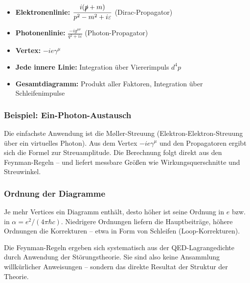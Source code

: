 \vspace{0.5em}
\begin{tcolorbox}[mathebox, title=Feynman-Regeln der QED (vereinfacht)]
	\label{box:Feynman-Regeln der QED}
	\begin{itemize}
		\item \textbf{Elektronenlinie:} $\displaystyle \frac{i(\slashed{p} + m)}{p^2 - m^2 + i\varepsilon}$ (Dirac-Propagator)
		\item \textbf{Photonenlinie:} $\displaystyle \frac{-ig^{\mu\nu}}{q^2 + i\varepsilon}$ (Photon-Propagator)
		\item \textbf{Vertex:} $-ie\gamma^\mu$
		\item \textbf{Jede innere Linie:} Integration über Viererimpuls $d^4p$
		\item \textbf{Gesamtdiagramm:} Produkt aller Faktoren, Integration über Schleifenimpulse
	\end{itemize}
\end{tcolorbox}

\subsubsection*{Beispiel: Ein-Photon-Austausch}
Die einfachste Anwendung ist die Møller-Streuung (Elektron-Elektron-Streuung über ein virtuelles Photon). Aus dem Vertex $-ie\gamma^\mu$ und den Propagatoren ergibt sich die Formel zur Streuamplitude. Die Berechnung folgt direkt aus den Feynman-Regeln – und liefert messbare Größen wie Wirkungsquerschnitte und Streuwinkel.

\subsubsection*{Ordnung der Diagramme}
Je mehr Vertices ein Diagramm enthält, desto höher ist seine Ordnung in $e$ bzw. in $\alpha = e^2 / (4\pi\hbar c)$. Niedrigere Ordnungen liefern die Hauptbeiträge, höhere Ordnungen die Korrekturen – etwa in Form von Schleifen (Loop-Korrekturen).

\medskip
\begin{tcolorbox}[didaktikbox, title=Warum die Regeln funktionieren]
	\label{box:Warum die Regeln funktionieren}
	Die Feynman-Regeln ergeben sich systematisch aus der QED-Lagrangedichte durch Anwendung der Störungstheorie. Sie sind also keine Ansammlung willkürlicher Anweisungen – sondern das direkte Resultat der Struktur der Theorie.
\end{tcolorbox}

